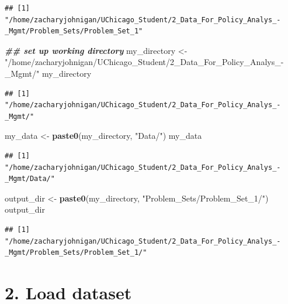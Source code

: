 \documentclass[
]{article}
\newenvironment{Shaded}{\begin{snugshade}}{\end{snugshade}}
\newcommand{\DocumentationTok}[1]{\textcolor[rgb]{0.56,0.35,0.01}{\textbf{\textit{#1}}}}
\newcommand{\FunctionTok}[1]{\textcolor[rgb]{0.13,0.29,0.53}{\textbf{#1}}}
\newcommand{\NormalTok}[1]{#1}
\newcommand{\OtherTok}[1]{\textcolor[rgb]{0.56,0.35,0.01}{#1}}
\newcommand{\StringTok}[1]{\textcolor[rgb]{0.31,0.60,0.02}{#1}}
\begin{document}
\begin{verbatim}
## [1] "/home/zacharyjohnigan/UChicago_Student/2_Data_For_Policy_Analys_-_Mgmt/Problem_Sets/Problem_Set_1"
\end{verbatim}

\begin{Shaded}
\begin{Highlighting}[]
\DocumentationTok{\#\# set up working directory}
\NormalTok{my\_directory   }\OtherTok{\textless{}{-}} \StringTok{"/home/zacharyjohnigan/UChicago\_Student/2\_Data\_For\_Policy\_Analys\_{-}\_Mgmt/"}
\NormalTok{my\_directory}
\end{Highlighting}
\end{Shaded}

\begin{verbatim}
## [1] "/home/zacharyjohnigan/UChicago_Student/2_Data_For_Policy_Analys_-_Mgmt/"
\end{verbatim}

\begin{Shaded}
\begin{Highlighting}[]
\NormalTok{my\_data        }\OtherTok{\textless{}{-}} \FunctionTok{paste0}\NormalTok{(my\_directory, }\StringTok{"Data/"}\NormalTok{)}
\NormalTok{my\_data}
\end{Highlighting}
\end{Shaded}

\begin{verbatim}
## [1] "/home/zacharyjohnigan/UChicago_Student/2_Data_For_Policy_Analys_-_Mgmt/Data/"
\end{verbatim}

\begin{Shaded}
\begin{Highlighting}[]
\NormalTok{output\_dir     }\OtherTok{\textless{}{-}} \FunctionTok{paste0}\NormalTok{(my\_directory, }\StringTok{"Problem\_Sets/Problem\_Set\_1/"}\NormalTok{)}
\NormalTok{output\_dir}
\end{Highlighting}
\end{Shaded}

\begin{verbatim}
## [1] "/home/zacharyjohnigan/UChicago_Student/2_Data_For_Policy_Analys_-_Mgmt/Problem_Sets/Problem_Set_1/"
\end{verbatim}

\section{2. Load dataset}\label{load-dataset}
\end{document}

